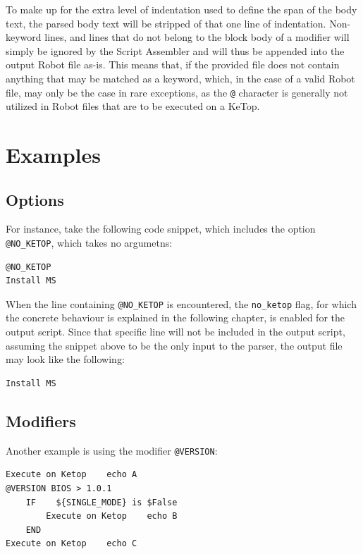To make up for the extra level of indentation used to define the span of the body text, the parsed body text will be stripped of that one line of indentation. Non-keyword lines, and lines that do not belong to the block body of a modifier will simply be ignored by the Script Assembler and will thus be appended into the output Robot file as-is. This means that, if the provided file does not contain anything that may be matched as a keyword, which, in the case of a valid Robot file, may only be the case in rare exceptions, as the \verb|@| character is generally not utilized in Robot files that are to be executed on a KeTop.

\section{Examples}

\subsection{Options}

For instance, take the following code snippet, which includes the option \verb|@NO_KETOP|, which takes no argumetns:

\begin{lstlisting}
@NO_KETOP
Install MS
\end{lstlisting}

When the line containing \verb|@NO_KETOP| is encountered, the \verb|no_ketop| flag, for which the concrete behaviour is explained in the following chapter, is enabled for the output script. Since that specific line will not be included in the output script, assuming the snippet above to be the only input to the parser, the output file may look like the following:

\begin{lstlisting}
Install MS
\end{lstlisting}

\subsection{Modifiers}

Another example is using the modifier \verb|@VERSION|:

\begin{lstlisting}
Execute on Ketop    echo A
@VERSION BIOS > 1.0.1
    IF    ${SINGLE_MODE} is $False
        Execute on Ketop    echo B
    END
Execute on Ketop    echo C
\end{lstlisting}

